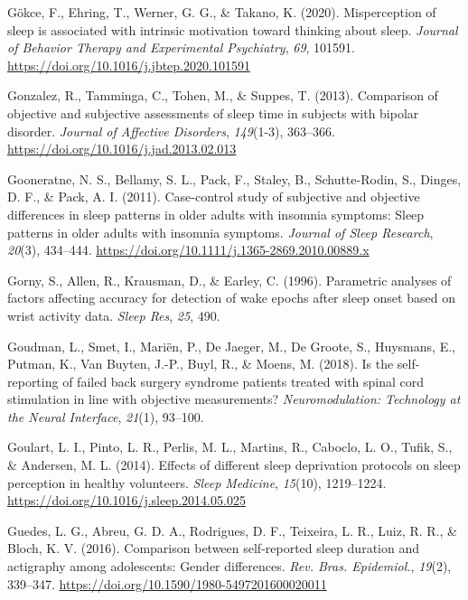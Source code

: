 \documentclass[
]{article}
\newlength{\cslhangindent}
\newenvironment{CSLReferences}[2] %
 {\begin{list}{}{%
  \setlength{\itemindent}{0pt}
  \setlength{\leftmargin}{0pt}
  \setlength{\parsep}{0pt}
  \ifodd #1
   \setlength{\leftmargin}{\cslhangindent}
   \setlength{\itemindent}{-1\cslhangindent}
  \fi
  \setlength{\itemsep}{#2\baselineskip}}}
 {\end{list}}
\begin{document}
\begin{CSLReferences}{1}{0}
Gökce, F., Ehring, T., Werner, G. G., \& Takano, K. (2020). Misperception of sleep is associated with intrinsic motivation toward thinking about sleep. \emph{Journal of Behavior Therapy and Experimental Psychiatry}, \emph{69}, 101591. \url{https://doi.org/10.1016/j.jbtep.2020.101591}

Gonzalez, R., Tamminga, C., Tohen, M., \& Suppes, T. (2013). Comparison of objective and subjective assessments of sleep time in subjects with bipolar disorder. \emph{Journal of Affective Disorders}, \emph{149}(1-3), 363--366. \url{https://doi.org/10.1016/j.jad.2013.02.013}

Gooneratne, N. S., Bellamy, S. L., Pack, F., Staley, B., Schutte-Rodin, S., Dinges, D. F., \& Pack, A. I. (2011). Case-control study of subjective and objective differences in sleep patterns in older adults with insomnia symptoms: {Sleep} patterns in older adults with insomnia symptoms. \emph{Journal of Sleep Research}, \emph{20}(3), 434--444. \url{https://doi.org/10.1111/j.1365-2869.2010.00889.x}

Gorny, S., Allen, R., Krausman, D., \& Earley, C. (1996). Parametric analyses of factors affecting accuracy for detection of wake epochs after sleep onset based on wrist activity data. \emph{Sleep Res}, \emph{25}, 490.

Goudman, L., Smet, I., Mariën, P., De Jaeger, M., De Groote, S., Huysmans, E., Putman, K., Van Buyten, J.-P., Buyl, R., \& Moens, M. (2018). Is the self-reporting of failed back surgery syndrome patients treated with spinal cord stimulation in line with objective measurements? \emph{Neuromodulation: Technology at the Neural Interface}, \emph{21}(1), 93--100.

Goulart, L. I., Pinto, L. R., Perlis, M. L., Martins, R., Caboclo, L. O., Tufik, S., \& Andersen, M. L. (2014). Effects of different sleep deprivation protocols on sleep perception in healthy volunteers. \emph{Sleep Medicine}, \emph{15}(10), 1219--1224. \url{https://doi.org/10.1016/j.sleep.2014.05.025}

Guedes, L. G., Abreu, G. D. A., Rodrigues, D. F., Teixeira, L. R., Luiz, R. R., \& Bloch, K. V. (2016). Comparison between self-reported sleep duration and actigraphy among adolescents: Gender differences. \emph{Rev. Bras. Epidemiol.}, \emph{19}(2), 339--347. \url{https://doi.org/10.1590/1980-5497201600020011}


\end{CSLReferences}
\end{document}
